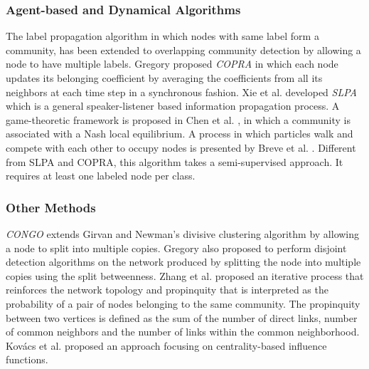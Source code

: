 \subsubsection*{Agent-based and Dynamical Algorithms}
The label propagation algorithm \cite{Raghavan} in which nodes with same label form a community, has been extended to overlapping community
detection by allowing a node to have multiple labels. Gregory proposed {\em COPRA} \cite{Gregory1} in which each node updates its belonging
coefficient by averaging the coefficients from all its neighbors at each time step in a synchronous fashion.  Xie et al. \cite{6137400}
developed {\em SLPA} which is a general speaker-listener based information propagation process. A game-theoretic framework is proposed in
Chen et al. \cite{Chen:2010}, in which a community is associated with
a Nash local equilibrium. A process in which particles walk and compete with each other to occupy nodes is presented by Breve et al.
\cite{Breve:2009}. Different from SLPA and COPRA, this algorithm takes a semi-supervised approach. It requires at least one labeled node per
class.

\subsubsection*{Other Methods}
{\em CONGO} \cite{Gregory:2007} extends Girvan and Newman's divisive clustering algorithm \cite{Girvan02} by allowing a node to split into
multiple copies.  Gregory
\cite{Gregory2009} also proposed to perform disjoint detection algorithms on the network produced by splitting the node into multiple copies
using the split betweenness. Zhang et al. \cite{Zhang:2009} proposed an iterative process that reinforces the network topology and
propinquity that is interpreted as the probability of a pair of nodes belonging to the same community. The propinquity between two
vertices is defined as the sum of the number of direct links, number of common neighbors and the number of links within the common
neighborhood. Kov\'{a}cs et al. \cite{Kovacs10} proposed an approach focusing on centrality-based influence functions. 



